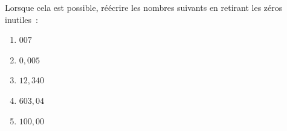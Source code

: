 \documentclass[exercice]{thedocument}%
\begin{document}
%
Lorsque cela est possible, réécrire les nombres
suivants en retirant les zéros inutiles~:
\begin{enumerate}
    \item $007$
    \item $0,005$
    \item $12,340$
    \item $603,04$
    \item $100,00$
\end{enumerate}
\end{document}
